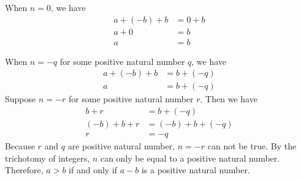 \documentclass[12pt]{article}
\begin{document}
\begin{flushleft}
\begin{enumerate}[(a)]
    When \(n =0\), we have
    \begin{equation*}
      \begin{aligned}
        a + (-b) + b &= 0 + b \\
        a + 0 &=b\\
        a &= b
      \end{aligned}
    \end{equation*}

    When \(n = -q\) for some positive natural number \(q\), we have
    \begin{equation*}
      \begin{aligned}
        a + (-b) + b &= b+(-q) \\
        a &= b + (-q)
      \end{aligned}
    \end{equation*}
    Suppose \(n=-r\) for some positive natural number \(r\). Then we have
    \begin{equation*}
      \begin{aligned}
        b + r &= b + (-q)\\
        (-b) + b + r &= (-b) + b + (-q)\\
        r &= -q
      \end{aligned}
    \end{equation*}
    Because \(r\) and \(q\) are positive natural number, \(n=-r\) can not be true.
    By the trichotomy of integers, \(n\) can only be equal to a positive natural number.
    Therefore, \(a > b\) if and only if \(a-b\) is a positive natural number.
\end{enumerate}

\end{flushleft}
\end{document}
